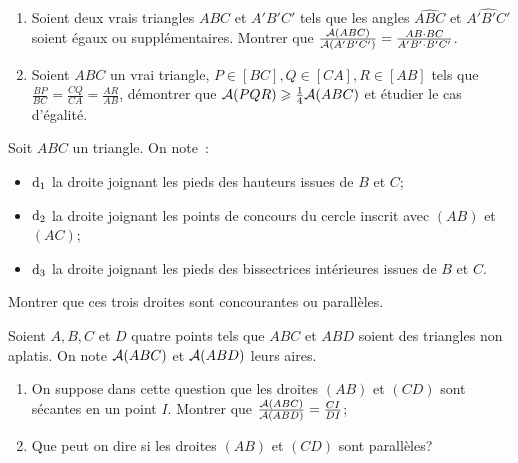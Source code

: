 \begin{exercice}
  \begin{enumerate}
    \item Soient deux vrais triangles \(ABC\) et \(A'B'C'\) 
      tels que les angles \(\widehat{ABC}\) et 
      \(\widehat{A'B'C'}\) soient égaux ou supplémentaires. 
      Montrer que \(\frac{\mathcal{A}(ABC)}{\mathcal{A}(A'B'C')} = \frac{AB 
      \cdot BC}{A'B' \cdot B'C'}\).
    \item Soient \(ABC\) un vrai triangle, \(P \in [BC], Q \in 
      [CA], R \in [AB]\) tels que \(\frac{BP}{BC} = 
      \frac{CQ}{CA} = \frac{AR}{AB}\), démontrer que \(\mathcal{A}(PQR) 
      \geqslant \frac{1}{4} \mathcal{A}(ABC)\) et étudier le cas 
      d'égalité.
  \end{enumerate}
\end{exercice}

\begin{exercice}
  Soit \(ABC\) un triangle. On note~:
  \begin{itemize}
    \item \(\mathrm{d}_1\) la droite joignant les pieds des hauteurs 
      issues de \(B\) et \(C\);
    \item \(\mathrm{d}_2\) la droite joignant les points de concours 
      du cercle inscrit avec \((AB)\) et \((AC)\);
    \item \(\mathrm{d}_3\) la droite joignant les pieds des 
      bissectrices intérieures issues de \(B\) et \(C\).
  \end{itemize}
  Montrer que ces trois droites sont concourantes ou 
  parallèles.
\end{exercice}

\begin{exercice}
  Soient \(A, B, C\) et \(D\) quatre points tels que \(ABC\) 
  et \(ABD\) soient des triangles non aplatis. On note 
  \(\mathcal{A}(ABC)\) et \(\mathcal{A}(ABD)\) leurs aires.
  \begin{enumerate}
    \item On suppose dans cette question que les droites 
      \((AB)\) et \((CD)\) sont sécantes en un point \(I\). 
      Montrer que \(\frac{\mathcal{A}(ABC)}{\mathcal{A}(ABD)} = \frac{CI}{DI}\);
    \item Que peut on dire si les droites \((AB)\) et \((CD)\) 
      sont parallèles?
  \end{enumerate}
\end{exercice}
